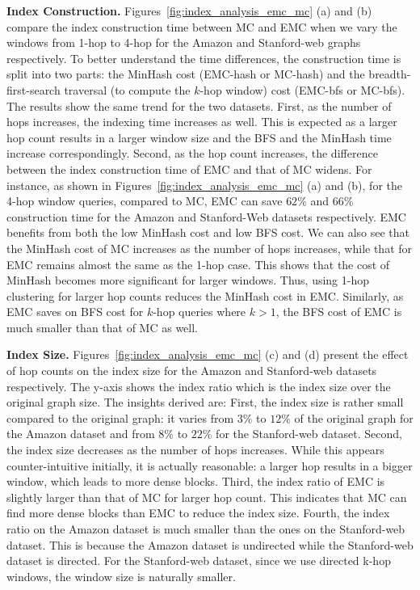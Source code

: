 \textbf{Index Construction. } Figures~\ref{fig:index_analysis_emc_mc} 
(a) and (b) compare the index construction time between MC and EMC 
when we vary the windows from 1-hop to 4-hop for the Amazon and Stanford-web 
graphs respectively. To better understand the time differences, 
the construction time is split into two parts: 
the MinHash cost (EMC-hash or MC-hash) and the breadth-first-search traversal (to compute the $k$-hop window)  cost (EMC-bfs or MC-bfs). The results show the same trend 
for the two datasets. %
First, as the number of hops increases, the indexing time increases as well. 
This is expected as a larger hop count results in a larger window size 
and the BFS and the MinHash time increase correspondingly. 
Second, as the hop count increases, the difference between the
index construction time of EMC and that of MC widens. 
For instance, as shown in Figures~\ref{fig:index_analysis_emc_mc} (a) and (b), for the 4-hop window queries, compared to MC, 
EMC can save $62\%$ and $66\%$ construction time for the Amazon and Stanford-Web datasets respectively.
EMC benefits from both the low MinHash cost and low BFS cost. 
We can also see that the MinHash cost of MC increases as the number of hops 
increases, while that for EMC remains almost the same as the 1-hop case. 
This shows that the cost of MinHash becomes more significant for larger windows. 
Thus, using 1-hop clustering for larger hop counts reduces the MinHash cost 
in EMC. Similarly, as EMC saves on BFS cost for $k$-hop queries where $k > 1$, 
the BFS cost of EMC is much smaller than that of MC as well. 

\textbf{Index Size.} Figures~\ref{fig:index_analysis_emc_mc} (c) and (d) 
present the effect of hop counts on the index size for the Amazon and Stanford-web 
datasets respectively. The y-axis shows the index ratio which is the index size over the original graph size. 
The insights derived are: 
First, the index size is rather small compared to the original graph: it
varies from $3\%$ to $12\%$ of the original graph for the Amazon dataset 
and from $8\%$ to $22\%$ for the Stanford-web dataset. 
Second, the index size decreases as the number of hops increases. 
While this appears counter-intuitive initially, it is actually reasonable: a larger hop results in a bigger window, which leads
to more dense blocks. Third, the index ratio of EMC is slightly larger 
than that of MC for larger hop count. This indicates that MC can find more dense blocks 
than EMC to reduce the index size. Fourth, the index ratio on 
the Amazon dataset is much smaller than the ones on the Stanford-web dataset. 
This is because the Amazon dataset is undirected while the Stanford-web dataset
is directed. For the Stanford-web dataset, since we use directed k-hop windows, the window size is naturally smaller. 

